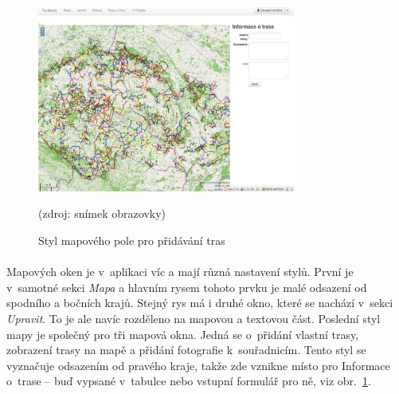 \documentclass[11pt,a4paper,titlepage,oneside]{book}
\begin{document}

		\begin{figure}[!h]
			\begin{center}
				\includegraphics[width=8.5cm]{obrazky/toulavej/addTrack.png}
				\caption{Styl mapového pole pro přidávání tras}
				\label{fig:addTrack}
				(zdroj: snímek obrazovky)
			\end{center}
		\end{figure}	
			\paragraph{} Mapových oken je v~aplikaci víc a mají různá nastavení stylů. První je v~samotné sekci \textit{Mapa} a hlavním rysem tohoto prvku je malé odsazení od spodního a bočních krajů. Stejný rys má i druhé okno, které se nachází v~sekci \textit{Upravit}. To je ale navíc rozděleno na mapovou a textovou část. Poslední styl mapy je společný pro tři mapová okna. Jedná se o~přidání vlastní trasy, zobrazení trasy na mapě a přidání fotografie k~souřadnicím. Tento styl se vyznačuje odsazením od pravého kraje, takže zde vznikne místo pro Informace o~trase -- buď vypsané v~tabulce nebo vstupní formulář pro ně, viz obr.~\ref{fig:addTrack}.
\end{document}
